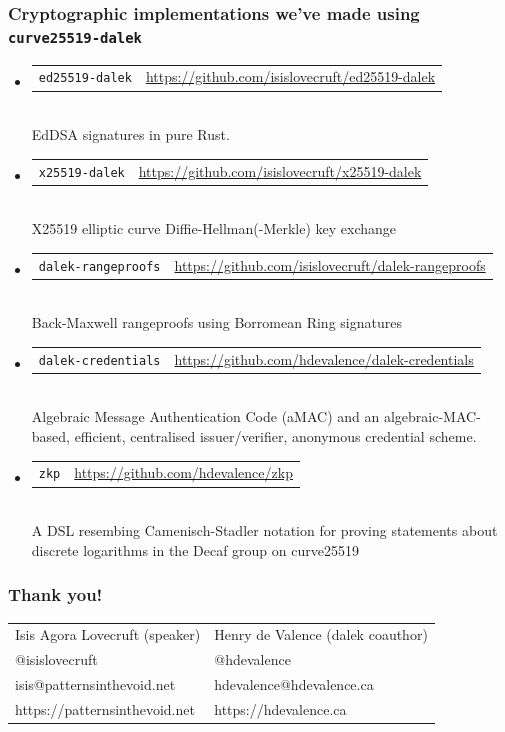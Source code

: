 \documentclass[xetex,aspectratio=169]{beamer}
\begin{document}
\begin{frame}
  \frametitle{Cryptographic implementations we've made using \texttt{curve25519-dalek}}

  \begin{itemize}
    \pause \item \begin{tabular}{lr}
      \texttt{ed25519-dalek} & \href{https://github.com/isislovecruft/ed25519-dalek}{https://github.com/isislovecruft/ed25519-dalek}
      \end{tabular} \\
      EdDSA signatures in pure Rust.
    \pause \item \begin{tabular}{lr}
      \texttt{x25519-dalek} & \href{https://github.com/isislovecruft/x25519-dalek}{https://github.com/isislovecruft/x25519-dalek}
      \end{tabular} \\
      X25519 elliptic curve Diffie-Hellman(-Merkle) key exchange
    \pause \item \begin{tabular}{lr}
      \texttt{dalek-rangeproofs} & \href{https://github.com/isislovecruft/dalek-rangeproofs}{https://github.com/isislovecruft/dalek-rangeproofs}
      \end{tabular} \\
      Back-Maxwell rangeproofs using Borromean Ring signatures
    \pause \item \begin{tabular}{lr}
      \texttt{dalek-credentials} & \href{https://github.com/hdevalence/dalek-credentials}{https://github.com/hdevalence/dalek-credentials}
      \end{tabular} \\
      Algebraic Message Authentication Code (aMAC) and an algebraic-MAC-based,
      efficient, centralised issuer/verifier, anonymous credential scheme.
    \pause \item \begin{tabular}{lr}
      \texttt{zkp} & \href{https://github.com/hdevalence/zkp}{https://github.com/hdevalence/zkp}
      \end{tabular} \\
      A DSL resembing Camenisch-Stadler notation for proving statements about
      discrete logarithms in the Decaf group on curve25519
  \end{itemize}

\end{frame}


  \begin{frame}
    \frametitle{Thank you!}
    \begin{tabular}{ll}
      Isis Agora Lovecruft (speaker) & Henry de Valence (dalek coauthor)\\
      @isislovecruft                 & @hdevalence \\
      isis@patternsinthevoid.net     & hdevalence@hdevalence.ca \\
      https://patternsinthevoid.net  & https://hdevalence.ca
    \end{tabular}
  \end{frame}
\end{document}
